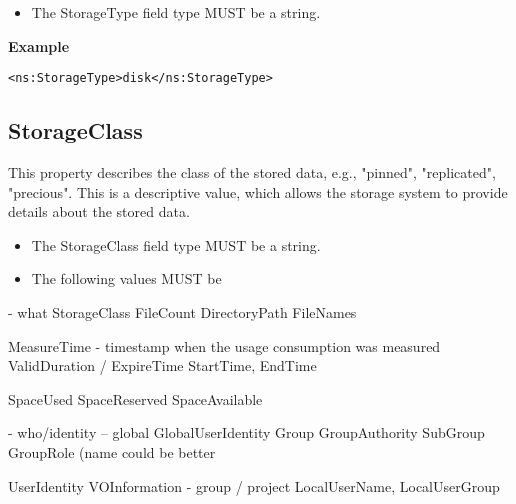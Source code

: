 \begin{itemize}
\item The StorageType field type MUST be a string.
\end{itemize}

{\bf Example}
\begin{verbatim}
<ns:StorageType>disk</ns:StorageType>
\end{verbatim}


\subsection{StorageClass}

This property describes the class of the stored data, e.g., "pinned",
"replicated", "precious". This is a descriptive value, which allows the storage
system to provide details about the stored data.

\begin{itemize}
\item The StorageClass field type MUST be a string.
\item The following values MUST be 
\end{itemize}


 - what
StorageClass
FileCount
DirectoryPath
FileNames




MeasureTime     - timestamp when the usage consumption was measured
  ValidDuration / ExpireTime
  StartTime, EndTime


SpaceUsed
SpaceReserved
SpaceAvailable

 - who/identity
   -- global
   GlobalUserIdentity
   Group
   GroupAuthority
   SubGroup
   GroupRole (name could be better

UserIdentity
VOInformation       - group / project
LocalUserName,
LocalUserGroup



